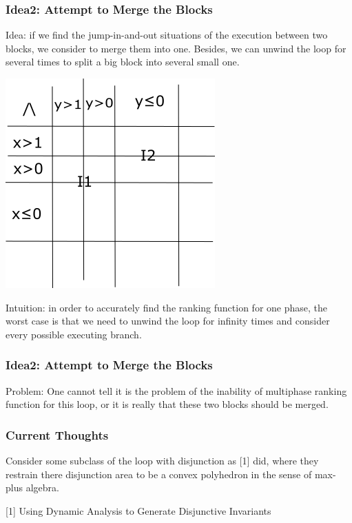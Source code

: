 \documentclass[11pt]{beamer}
\begin{document}
\begin{frame}\frametitle{Idea2: Attempt to Merge the Blocks}
Idea: if we find the jump-in-and-out situations of the execution between two blocks, we consider to merge them into one. Besides, we can unwind the loop for several times to split a big block into several small one.
\begin{center}

\includegraphics[scale = 0.45]{split.png}

\end{center}
Intuition: in order to accurately find the ranking function for one phase, the worst case is that we need to unwind the loop for infinity times and consider every possible executing branch.
\end{frame}

\begin{frame}\frametitle{Idea2: Attempt to Merge the Blocks}

Problem: One cannot tell it is the problem of the inability of multiphase ranking function for this loop, or it is really that these two blocks should be merged.

\end{frame}

\begin{frame}\frametitle{Current Thoughts}
Consider some subclass of the loop with disjunction as [1] did, where they restrain there disjunction area to be a convex polyhedron in the sense of max-plus algebra.

[1] Using Dynamic Analysis to Generate Disjunctive Invariants
\end{frame}
\end{document}
